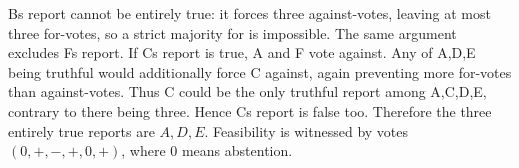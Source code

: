 B\textquotesingle s report cannot be entirely true: it forces three against-votes, leaving at most three for-votes, so a strict majority for is impossible. The same argument excludes F\textquotesingle s report. If C\textquotesingle s report is true, A and F vote against. Any of A,D,E being truthful would additionally force C against, again preventing more for-votes than against-votes. Thus C could be the only truthful report among A,C,D,E, contrary to there being three. Hence C\textquotesingle s report is false too. Therefore the three entirely true reports are $\boxed{A,D,E}$. Feasibility is witnessed by votes $(0,+,-,+,0,+)$, where $0$ means abstention.
